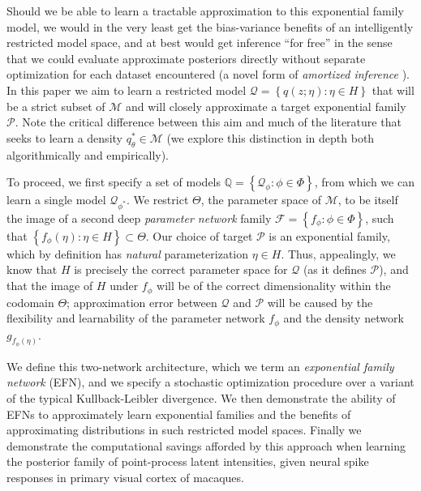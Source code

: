 \documentclass[twoside]{article}
\begin{document}
 Should we be able to learn a tractable approximation to this exponential family model, we would in the very least get the bias-variance benefits of an intelligently restricted model space, and at best would get inference ``for free'' in the sense that we could evaluate approximate posteriors directly without separate optimization for each dataset encountered (a novel form of \emph{amortized inference} \citep{gershman2014amortized,Kingma:2013aa,rezende2014stochastic,stuhlmuller2013learning}).  
 In this paper we aim to learn a restricted model $\mathcal{Q} = \left\{ q(z; \eta): \eta \in H \right\}$ that will be a strict subset of $\mathcal{M}$ and will closely approximate a target exponential family $\mathcal{P}$.  
 Note the critical difference between this aim and much of the literature that seeks to learn a density $q_{\theta}^* \in \mathcal{M}$ (we explore this distinction in depth both algorithmically and empirically).  
 
To proceed, we first specify a set of models $\mathbb{Q} = \left\{ \mathcal{Q}_\phi : \phi \in \Phi \right\}$, from which we can learn a single model $\mathcal{Q}_{\phi^*}$.  We restrict $\Theta$, the parameter space of $\mathcal{M}$, to be itself the image of a second deep \emph{parameter network} family $\mathcal{F} = \left\{f_\phi : \phi \in \Phi\right\}$, such that $\left\{ f_\phi(\eta) : \eta \in H \right\} \subset \Theta$.
Our choice of target $\mathcal{P}$ is an exponential family,  which by definition has \emph{natural} parameterization $\eta \in H$.   Thus, appealingly, we know that $H$ is precisely the correct parameter space for $\mathcal{Q}$ (as it defines $\mathcal{P}$), and that the image of $H$ under $f_\phi$ will be of the correct dimensionality within the codomain $\Theta$; approximation error between $\mathcal{Q}$ and $\mathcal{P}$ will be caused by the flexibility and learnability of the parameter network $f_\phi$ and the density network $g_{f_{\phi}(\eta)}$.  

We define this two-network architecture, which we term an \emph{exponential family network} (EFN), and we specify a stochastic optimization procedure over a variant of the typical Kullback-Leibler divergence.  We then demonstrate the ability of EFNs to approximately learn exponential families and the benefits of approximating distributions in such restricted model spaces.  Finally we demonstrate the computational savings afforded by this approach when learning the posterior family of point-process latent intensities, given neural spike responses in primary visual cortex of macaques. 
\end{document}
